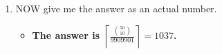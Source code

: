 \documentclass[12pt]{article}
\begin{document}
\begin{enumerate}
\begin{enumerate}
\item
NOW give me the answer as an actual number. 
\begin{itemize}
    \item \textbf{The answer is $\left\lceil \frac{\binom{50}{10}}{9909901}\right\rceil = 1037$.}
\end{itemize}

\end{enumerate}

\end{enumerate}
\end{document}

